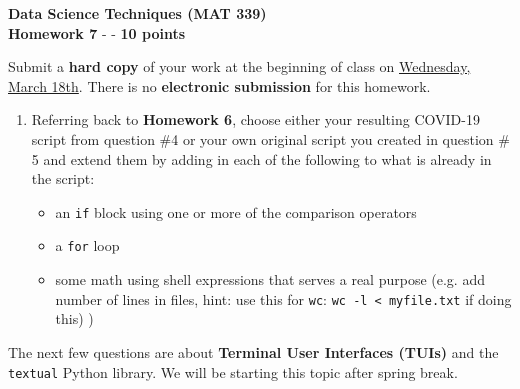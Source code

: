 \documentclass[12pt]{article}
\begin{document}
	
	\begin{center}
		\textbf{Data Science Techniques (MAT 339)} \\
		\textbf{Homework 7} - - \textbf{10 points}\\
	\end{center}
	Submit a \textbf{hard copy }of your work at the beginning of class on \underline{Wednesday, March 18th}. There is no \textbf{electronic submission }for this homework. \\
	
	\begin{enumerate}
		
		\item Referring back to \textbf{Homework 6}, choose either your resulting COVID-19 script from question \#4 or your own original script you created in question \# 5 and extend them by adding in each of the following to what is already in the script:
		\begin{itemize}
			\item an \texttt{if} block using one or more of the comparison operators 
			\item a \texttt{for} loop
			\item some math using shell expressions that serves a real purpose (e.g. add number of lines in files, hint: use this for \texttt{wc}:   \texttt{wc -l < myfile.txt} if doing this)
			 )
		\end{itemize}

	\end{enumerate}
	
	\noindent The next few questions are about \textbf{Terminal User Interfaces (TUIs)} and the \texttt{textual} Python library. We will be starting this topic after spring break.
	
\end{document}
